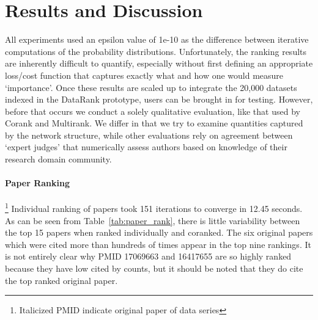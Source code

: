 \section{Results and Discussion}
\label{sec:results}
All experiments used an epsilon value of 1e-10 as the difference between iterative computations of the probability distributions. Unfortunately, the ranking results are inherently difficult to quantify, especially without first defining an appropriate loss/cost function that captures exactly what and how one would measure `importance'. Once these results are scaled up to integrate the 20,000 datasets indexed in the DataRank prototype, users can be brought in for testing. However, before that occurs we conduct a solely qualitative evaluation, like that used by Corank and Multirank. We differ in that we try to examine quantities captured by the network structure, while other evaluations rely on agreement between `expert judges' that numerically assess authors based on knowledge of their research domain community.

\paragraph{Paper Ranking}\footnote{Italicized PMID indicate original paper of data series}
Individual ranking of papers took 151 iterations to converge in 12.45 seconds. As can be seen from Table~\ref{tab:paper_rank}, there is little variability between the top 15 papers when ranked individually and coranked. The six original papers which were cited more than hundreds of times appear in the top nine rankings. It is not entirely clear why PMID 17069663 and 16417655 are so highly ranked because they have low cited by counts, but it should be noted that they do cite the top ranked original paper.

